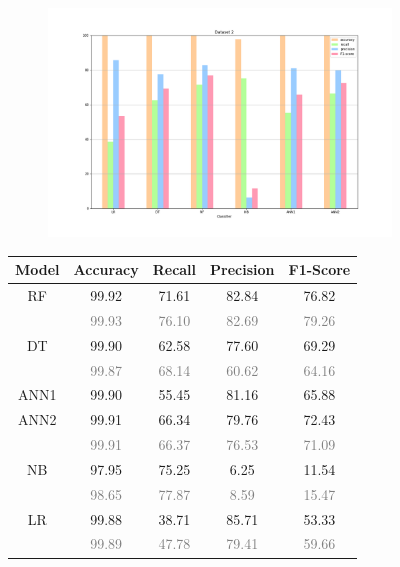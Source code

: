 \documentclass{Configuration_Files/PoliMi3i_thesis}
\begin{document}
\begin{figure}[H]
\centering
\begin{subfigure}
    \centering
    \includegraphics[scale=0.3]{Images/Dataset_2.png}
\end{subfigure}

\renewcommand{\arraystretch}{0.8}%
\begin{table}[H]
\centering 
    \begin{tabular}{ c  c  c  c  c }
    \hline 
    \textbf{Model}  & \textbf{Accuracy} & \textbf{Recall} & \textbf{Precision} & \textbf{F1-Score} \\
    \hline
    RF	& 99.92 & 71.61	& 82.84 & 76.82 \\
        & \footnotesize\textcolor{gray}{99.93} & \footnotesize\textcolor{gray}{76.10} & \footnotesize\textcolor{gray}{82.69} & \footnotesize\textcolor{gray}{79.26} \\[0.01cm]
    DT	& 99.90 & 62.58	& 77.60 & 69.29 \\
        & \footnotesize\textcolor{gray}{99.87} & \footnotesize\textcolor{gray}{68.14} & \footnotesize\textcolor{gray}{60.62} & \footnotesize\textcolor{gray}{64.16} \\
    ANN1 & 99.90 & 55.45 & 81.16 & 65.88 \\
    ANN2 & 99.91 & 66.34 & 79.76 & 72.43 \\
         & \footnotesize\textcolor{gray}{99.91} & \footnotesize\textcolor{gray}{66.37} & \footnotesize\textcolor{gray}{76.53} & \footnotesize\textcolor{gray}{71.09} \\
    NB	& 97.95 & 75.25	& 6.25 & 11.54 \\
        & \footnotesize\textcolor{gray}{98.65} & \footnotesize\textcolor{gray}{77.87} & \footnotesize\textcolor{gray}{8.59} & \footnotesize\textcolor{gray}{15.47} \\
    LR	& 99.88 & 38.71	& 85.71 & 53.33 \\
        & \footnotesize\textcolor{gray}{99.89} & \footnotesize\textcolor{gray}{47.78} & \footnotesize\textcolor{gray}{79.41} & \footnotesize\textcolor{gray}{59.66} \\
    \hline
    \end{tabular}
\end{table}


\end{figure}
\end{document}
